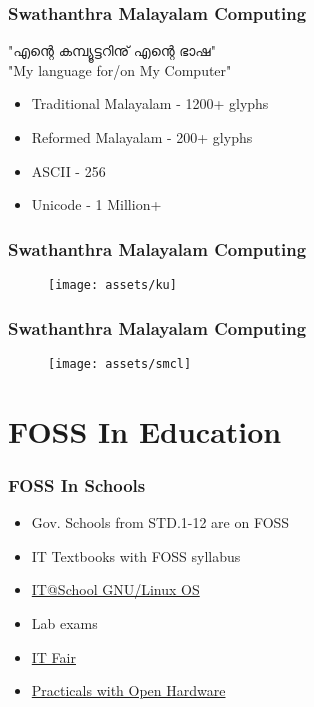 \documentclass{beamer}
\def\manjari{\fontspec[Script=Malayalam]{Manjari}}
\begin{document}
\begin{frame}
\frametitle{Swathanthra Malayalam Computing}
{\centering \manjari
"എന്റെ കമ്പ്യൂട്ടറിനു് എന്റെ ഭാഷ" \\
"My language for/on My Computer" \\
}
\vspace{5mm}
\begin{itemize}
	\item Traditional Malayalam - 1200+ glyphs
	\item Reformed Malayalam - 200+ glyphs
\end{itemize}
\begin{itemize}
	\item ASCII - 256
	\item Unicode - 1 Million+
\end{itemize}
\end{frame}

\begin{frame}
\frametitle{Swathanthra Malayalam Computing}
\begin{figure}
	\texttt{[image: assets/ku]}
\end{figure}
\end{frame}

\begin{frame}
\frametitle{Swathanthra Malayalam Computing}
\begin{figure}
	\texttt{[image: assets/smcl]}
\end{figure}
\end{frame}

\section{FOSS In Education}
\begin{frame}
\frametitle{FOSS In Schools}
\begin{itemize}
	\item Gov. Schools from STD.1-12 are on FOSS
	\item IT Textbooks with FOSS syllabus
	\item \href{https://itschool.gov.in}{IT@School GNU/Linux OS}
	\item Lab exams
	\item \href{http://schoolsasthrolsavam.in}{IT Fair}
	\item \href{https://www.thehindu.com/news/national/kerala/making-physics-experiments-easier/article27190001.ece}{Practicals with Open Hardware}
\end{itemize}
\end{frame}
\end{document}
